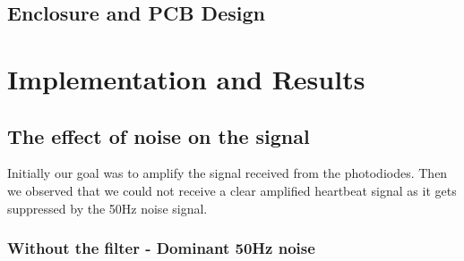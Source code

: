 \documentclass[12pt]{article}
\begin{document}
\subsection{Enclosure and PCB Design}

	




\newpage
\section{Implementation and Results}


\subsection{The effect of noise on the signal}
Initially our goal was to amplify the signal received from the photodiodes. Then we observed that we could not receive a clear amplified heartbeat signal as it gets suppressed by the 50Hz noise signal.

\subsubsection{Without the filter - Dominant 50Hz noise}
\end{document}
